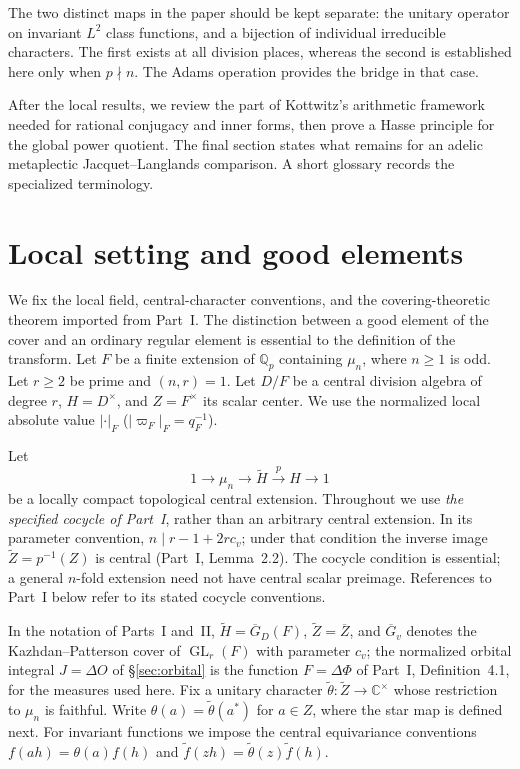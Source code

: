 \documentclass[11pt]{article}
\newcommand{\C}{\mathbb C}
\newcommand{\GL}{\operatorname{GL}}
\newcommand{\tH}{\widetilde H}
\newcommand{\tZ}{\widetilde Z}
\newcommand{\Gb}{\overline{G}}\newcommand{\GDb}{\overline{G}_D}\newcommand{\Zb}{\overline{Z}}
\theoremstyle{plain}
\theoremstyle{definition}
\begin{document}
The two distinct maps in the paper should be kept separate:
the unitary operator on invariant $L^2$ class functions, and a
bijection of individual irreducible characters. The first exists at
all division places, whereas the second is established here only
when $p\nmid n$. The Adams operation provides the bridge in that case.

After the local results, we review the part of Kottwitz's arithmetic
framework needed for rational conjugacy and inner forms, then prove
a Hasse principle for the global power quotient. The final section
states what remains for an adelic metaplectic Jacquet--Langlands
comparison. A short glossary records the specialized terminology.

\section{Local setting and good elements}
We fix the local field, central-character conventions, and the
covering-theoretic theorem imported from Part~I. The distinction
between a good element of the cover and an ordinary regular element
is essential to the definition of the transform.
Let $F$ be a finite extension of $\mathbb Q_p$ containing $\mu_n$, where $n\ge1$ is odd. Let $r\ge2$ be prime and $(n,r)=1$. Let $D/F$ be a central division algebra of degree $r$, $H=D^\times$, and $Z=F^\times$ its scalar center. We use the normalized local absolute value $|\cdot|_F$ ($|\varpi_F|_F=q_F^{-1}$).

Let
\begin{equation}\label{eq:extension}
1\longrightarrow\mu_n\longrightarrow\tH\overset{p}{\longrightarrow}H\longrightarrow1
\end{equation}
be a locally compact topological central extension. Throughout we use \emph{the specified cocycle of Part~I}, rather than an arbitrary central extension. In its parameter convention, $n\mid r-1+2rc_v$; under that condition the inverse image $\tZ=p^{-1}(Z)$ is central (Part~I, Lemma~2.2). The cocycle condition is essential; a general $n$-fold extension need not have central scalar preimage. References to Part~I below refer to its stated cocycle conventions.

In the notation of Parts~I and~II, $\tH=\GDb(F)$, $\tZ=\Zb$, and $\Gb_v$ denotes the Kazhdan--Patterson cover of $\GL_r(F)$ with parameter $c_v$; the normalized orbital integral $J=\Delta O$ of \S\ref{sec:orbital} is the function $F=\Delta\Phi$ of Part~I, Definition~4.1, for the measures used here. Fix a unitary character $\widetilde\theta:\tZ\to\C^\times$ whose restriction to $\mu_n$ is faithful. Write $\theta(a)=\widetilde\theta(a^*)$ for $a\in Z$, where the star map is defined next. For invariant functions we impose the central equivariance conventions $f(ah)=\theta(a)f(h)$ and $\widetilde f(zh)=\widetilde\theta(z)\widetilde f(h)$.
\end{document}
